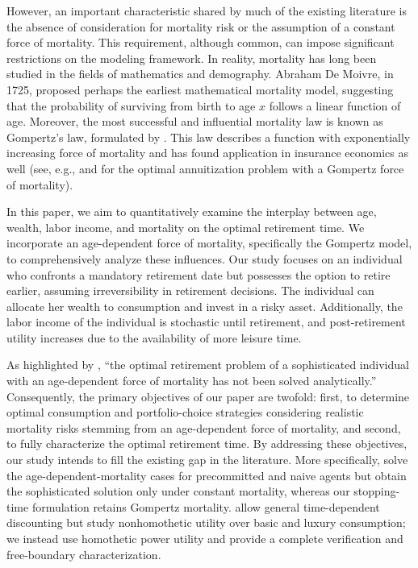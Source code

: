 \documentclass[a4paper,11pt]{amsart}
\numberwithin{equation}{section}
\begin{document}
However, an important characteristic shared by much of the existing literature is the absence of consideration for mortality risk or the assumption of a constant force of mortality. This requirement, although common, can impose significant restrictions on the modeling framework.  In reality, mortality has long been studied in the fields of mathematics and demography. Abraham De Moivre, in 1725, proposed perhaps the earliest mathematical mortality model, suggesting that the probability of surviving from birth to age $x$ follows a linear function of age. Moreover, the most successful and influential mortality law is known as Gompertz's law, formulated by \citet{gompertz1825nature}. This law describes a function with exponentially increasing force of mortality and has found application in insurance economics as well (see, e.g., \citet{milevsky2007annuitization} and \citet{de2019free} for the optimal annuitization problem with a Gompertz force of mortality).  %


In this paper, we aim to quantitatively examine the interplay between age, wealth, labor income, and mortality on the optimal retirement time. We {incorporate} an age-dependent force of mortality, specifically the Gompertz model, to comprehensively analyze these influences. Our study focuses on an individual who confronts a mandatory retirement date but possesses the option to retire earlier, assuming irreversibility in retirement decisions. The individual can allocate her wealth to consumption and invest in a risky asset. Additionally, the labor income of the individual is stochastic until retirement, and post-retirement utility increases due to the availability of more leisure time.

As highlighted by \citet{chen2021retirement}, ``the optimal retirement problem of a sophisticated individual with an age-dependent force of mortality has not been solved analytically.'' Consequently, the primary objectives of our paper are twofold: first, to determine optimal consumption and portfolio-choice strategies considering realistic mortality risks stemming from an age-dependent force of mortality, and second, to fully characterize the optimal retirement time. By addressing these objectives, our study intends to fill the existing gap in the literature. {More specifically, \citet{chen2021retirement} solve the age-dependent-mortality cases for precommitted and naive agents but obtain the sophisticated solution only under constant mortality, whereas our stopping-time formulation retains Gompertz mortality. \citet{jang2024optimal} allow general time-dependent discounting but study nonhomothetic utility over basic and luxury consumption; we instead use homothetic power utility and provide a complete verification and free-boundary characterization.}
\end{document}

